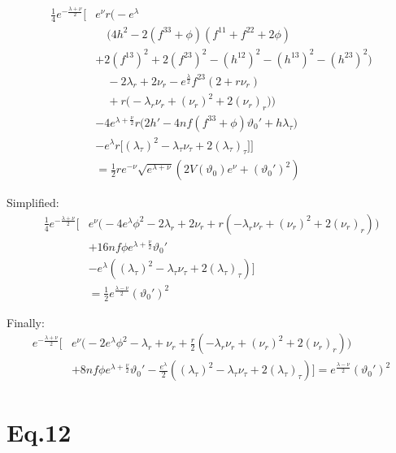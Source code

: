 \documentclass[12pt]{article}
\begin{document}
\begin{align*}
\frac{1}{4} e^{-\frac{\lambda + \nu}{2}} \Big[
 & e^{\nu} r \Big(
     - e^{\lambda} \\ & \quad \Big(
       4h^2 - 2(f^{33} + \phi)(f^{11} + f^{22} + 2\phi) \\
       & + 2(f^{13})^2 + 2(f^{23})^2
       - (h^{12})^2 - (h^{13})^2 - (h^{23})^2
     \Big) \\
 & \quad - 2 \lambda_r + 2 \nu_r
       - e^{\frac{\lambda}{2}} f^{23}\left(2 + r\nu_r\right) \\
 & \quad + r \Big(
       - \lambda_r \nu_r
       + (\nu_r)^2
       + 2 (\nu_r)_r
     \Big)
   \Big) \\
 & - 4 e^{\lambda + \frac{\nu}{2}} r
   \Big(
     2 h' - 4 nf (f^{33} + \phi) \vartheta_0' + h\lambda_\tau
   \Big) \\
 & - e^{\lambda} r
   \Big[
     \left(\lambda_\tau\right)^2
     - \lambda_\tau \nu_\tau
     + 2 (\lambda_\tau)_\tau
   \Big]
\Big] \\
&= \frac{1}{2} r e^{-\nu} \sqrt{e^{\lambda + \nu}}
   \left( 2 V(\vartheta_0) e^{\nu} + (\vartheta_0')^2 \right)
\end{align*}

Simplified:
\begin{align*}
\frac{1}{4} e^{-\frac{\lambda + \nu}{2}} \Big[
 & e^{\nu} \Big(
     - 4e^{\lambda}\phi^2 - 2 \lambda_r + 2 \nu_r 
      + r ( - \lambda_r \nu_r + (\nu_r)^2 + 2 (\nu_r)_r )
   \Big) \\
 & + 16 nf \phi e^{\lambda + \frac{\nu}{2}} \vartheta_0' \\
& - e^{\lambda}
   (
     \left(\lambda_\tau\right)^2
     - \lambda_\tau \nu_\tau
     + 2 (\lambda_\tau)_\tau
   )
\Big] \\
&= \frac{1}{2} e^\frac{\lambda - \nu}{2}(\vartheta_0')^2
\end{align*}

Finally:
\begin{align*}
e^{-\frac{\lambda + \nu}{2}} \Big[
 & e^{\nu} \Big(
     - 2e^{\lambda}\phi^2 - \lambda_r + \nu_r 
      + \frac{r}{2} ( - \lambda_r \nu_r + (\nu_r)^2 + 2 (\nu_r)_r )
   \Big) \\
 & + 8 nf \phi e^{\lambda + \frac{\nu}{2}} \vartheta_0' - \frac{e^{\lambda}}{2} (\left(\lambda_\tau\right)^2 - \lambda_\tau \nu_\tau + 2 (\lambda_\tau)_\tau)
\Big] = e^\frac{\lambda - \nu}{2}(\vartheta_0')^2
\end{align*}

\section*{Eq.12}
\end{document}
